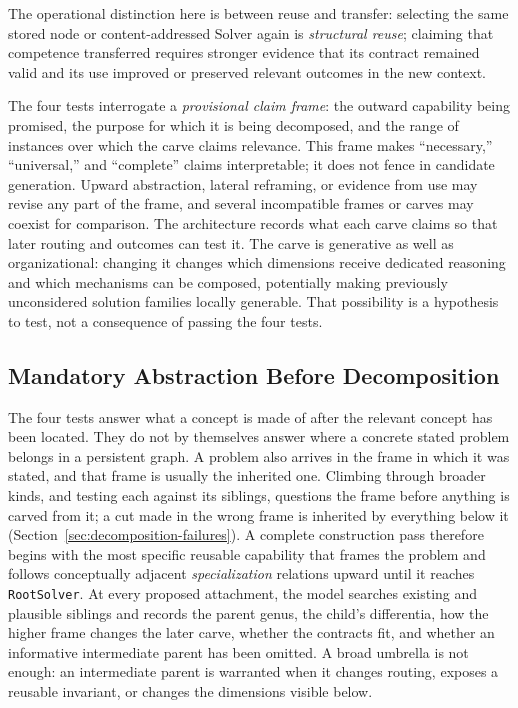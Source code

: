 \documentclass[11pt]{article}
\let\oldtexttt\texttt
\renewcommand{\texttt}[1]{\oldtexttt{\small #1}}
\begin{document}
The operational distinction here is between reuse and transfer: selecting the same stored node or content-addressed Solver again is \emph{structural reuse}; claiming that competence transferred requires stronger evidence that its contract remained valid and its use improved or preserved relevant outcomes in the new context.

The four tests interrogate a \emph{provisional claim frame}: the outward capability being promised, the purpose for which it is being decomposed, and the range of instances over which the carve claims relevance. This frame makes ``necessary,'' ``universal,'' and ``complete'' claims interpretable; it does not fence in candidate generation. Upward abstraction, lateral reframing, or evidence from use may revise any part of the frame, and several incompatible frames or carves may coexist for comparison. The architecture records what each carve claims so that later routing and outcomes can test it. The carve is generative as well as organizational: changing it changes which dimensions receive dedicated reasoning and which mechanisms can be composed, potentially making previously unconsidered solution families locally generable. That possibility is a hypothesis to test, not a consequence of passing the four tests.

\subsection{Mandatory Abstraction Before Decomposition}
\label{sec:mandatory-abstraction}

The four tests answer what a concept is made of after the relevant concept has been located. They do not by themselves answer where a concrete stated problem belongs in a persistent graph. A problem also arrives in the frame in which it was stated, and that frame is usually the inherited one. Climbing through broader kinds, and testing each against its siblings, questions the frame before anything is carved from it; a cut made in the wrong frame is inherited by everything below it (Section~\ref{sec:decomposition-failures}). A complete construction pass therefore begins with the most specific reusable capability that frames the problem and follows conceptually adjacent \emph{specialization} relations upward until it reaches \texttt{RootSolver}. At every proposed attachment, the model searches existing and plausible siblings and records the parent genus, the child's differentia, how the higher frame changes the later carve, whether the contracts fit, and whether an informative intermediate parent has been omitted. A broad umbrella is not enough: an intermediate parent is warranted when it changes routing, exposes a reusable invariant, or changes the dimensions visible below.
\end{document}
